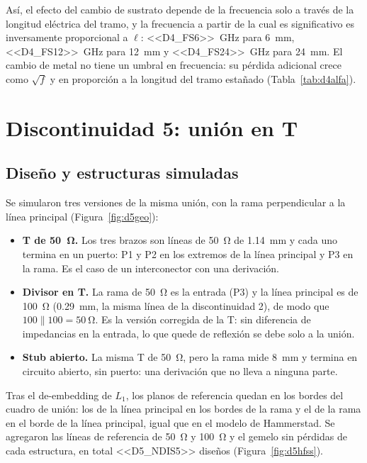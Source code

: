 \documentclass[11pt,letterpaper]{article}
\begin{document}
Así, el efecto del cambio de sustrato depende de la frecuencia solo a través de la longitud eléctrica del tramo, y la frecuencia a partir de la cual es significativo es inversamente proporcional a $\ell$: \SI{<<D4_FS6>>}{GHz} para \SI{6}{mm}, \SI{<<D4_FS12>>}{GHz} para \SI{12}{mm} y \SI{<<D4_FS24>>}{GHz} para \SI{24}{mm}. El cambio de metal no tiene un umbral en frecuencia: su pérdida adicional crece como $\sqrt{f}$ y en proporción a la longitud del tramo estañado (Tabla~\ref{tab:d4alfa}).

\section{Discontinuidad 5: unión en T}
\label{sec:d5}

\subsection{Diseño y estructuras simuladas}
Se simularon tres versiones de la misma unión, con la rama perpendicular a la línea principal (Figura~\ref{fig:d5geo}):
\begin{itemize}
\item \textbf{T de \SI{50}{\ohm}.} Los tres brazos son líneas de \SI{50}{\ohm} de \SI{1.14}{mm} y cada uno termina en un puerto: P1 y P2 en los extremos de la línea principal y P3 en la rama. Es el caso de un interconector con una derivación.
\item \textbf{Divisor en T.} La rama de \SI{50}{\ohm} es la entrada (P3) y la línea principal es de \SI{100}{\ohm} (\SI{0.29}{mm}, la misma línea de la discontinuidad 2), de modo que $100\parallel 100=\SI{50}{\ohm}$. Es la versión corregida de la T: sin diferencia de impedancias en la entrada, lo que quede de reflexión se debe solo a la unión.
\item \textbf{Stub abierto.} La misma T de \SI{50}{\ohm}, pero la rama mide \SI{8}{mm} y termina en circuito abierto, sin puerto: una derivación que no lleva a ninguna parte.
\end{itemize}
Tras el de-embedding de $L_1$, los planos de referencia quedan en los bordes del cuadro de unión: los de la línea principal en los bordes de la rama y el de la rama en el borde de la línea principal, igual que en el modelo de Hammerstad. Se agregaron las líneas de referencia de \SI{50}{\ohm} y \SI{100}{\ohm} y el gemelo sin pérdidas de cada estructura, en total <<D5_NDIS5>> diseños (Figura~\ref{fig:d5hfss}).
\end{document}
